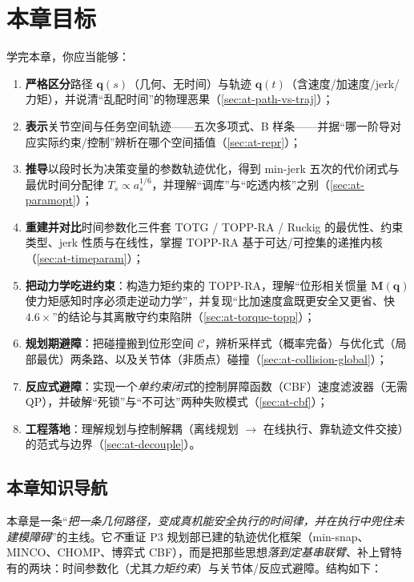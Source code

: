\section*{本章目标}
学完本章，你应当能够：
\begin{enumerate}
  \item \textbf{严格区分}路径 $\mathbf{q}(s)$（几何、无时间）与轨迹 $\mathbf{q}(t)$（含速度/加速度/jerk/力矩），并说清“乱配时间”的物理恶果（\cref{sec:at-path-vs-traj}）；
  \item \textbf{表示}关节空间与任务空间轨迹——五次多项式、B 样条——并据“哪一阶导对应实际约束/控制”辨析在哪个空间插值（\cref{sec:at-repr}）；
  \item \textbf{推导}以段时长为决策变量的参数轨迹优化，得到 min-jerk 五次的代价闭式与最优时间分配律 $T_s\propto a_s^{1/6}$，并理解“调库”与“吃透内核”之别（\cref{sec:at-paramopt}）；
  \item \textbf{重建并对比}时间参数化三件套 TOTG / TOPP-RA / Ruckig 的最优性、约束类型、jerk 性质与在线性，掌握 TOPP-RA 基于可达/可控集的递推内核（\cref{sec:at-timeparam}）；
  \item \textbf{把动力学吃进约束}：构造力矩约束的 TOPP-RA，理解“位形相关惯量 $\mathbf{M}(\mathbf{q})$ 使力矩感知时序必须走逆动力学”，并复现“比加速度盒既更安全又更省、快 $4.6\times$”的结论与其离散守约束陷阱（\cref{sec:at-torque-topp}）；
  \item \textbf{规划期避障}：把碰撞搬到位形空间 $\mathcal{C}$，辨析采样式（概率完备）与优化式（局部最优）两条路、以及关节体（非质点）碰撞（\cref{sec:at-collision-global}）；
  \item \textbf{反应式避障}：实现一个\emph{单约束闭式}的控制屏障函数（CBF）速度滤波器（无需 QP），并破解“死锁”与“不可达”两种失败模式（\cref{sec:at-cbf}）；
  \item \textbf{工程落地}：理解规划与控制解耦（离线规划 $\to$ 在线执行、靠轨迹文件交接）的范式与边界（\cref{sec:at-decouple}）。
\end{enumerate}

\subsection*{本章知识导航}
本章是一条“\emph{把一条几何路径，变成真机能安全执行的时间律，并在执行中兜住未建模障碍}”的主线。它\emph{不}重证 P3 规划部已建的轨迹优化框架（min-snap、MINCO、CHOMP、博弈式 CBF），而是把那些思想\emph{落到定基串联臂}、补上臂特有的两块：时间参数化（尤其\emph{力矩约束}）与关节体/反应式避障。结构如下：

